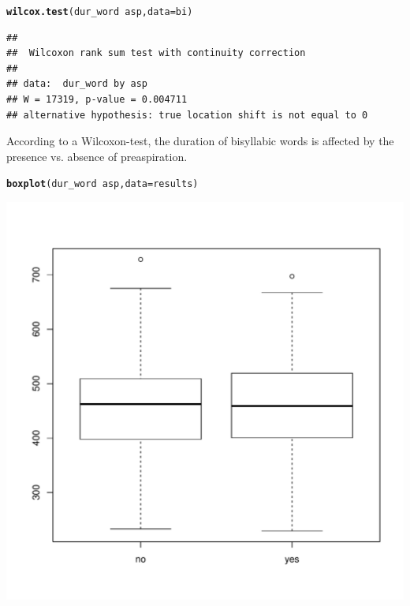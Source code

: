 \documentclass[a4paper,11pt]{article}\usepackage[]{graphicx}\usepackage[]{color}
\makeatletter
\def\maxwidth{ %
  \ifdim\Gin@nat@width>\linewidth
    \linewidth
  \else
    \Gin@nat@width
  \fi
}
\newcommand{\hlopt}[1]{\textcolor[rgb]{0,0,0}{#1}}%
\newcommand{\hlstd}[1]{\textcolor[rgb]{0.345,0.345,0.345}{#1}}%
\newcommand{\hlkwc}[1]{\textcolor[rgb]{0.333,0.667,0.333}{#1}}%
\newcommand{\hlkwd}[1]{\textcolor[rgb]{0.737,0.353,0.396}{\textbf{#1}}}%
\newenvironment{kframe}{%
 \def\at@end@of@kframe{}%
 \ifinner\ifhmode%
  \def\at@end@of@kframe{\end{minipage}}%
  \begin{minipage}{\columnwidth}%
 \fi\fi%
 \def\FrameCommand##1{\hskip\@totalleftmargin \hskip-\fboxsep
 \colorbox{shadecolor}{##1}\hskip-\fboxsep
     \hskip-\linewidth \hskip-\@totalleftmargin \hskip\columnwidth}%
 \MakeFramed {\advance\hsize-\width
   \@totalleftmargin\z@ \linewidth\hsize
   \@setminipage}}%
 {\par\unskip\endMakeFramed%
 \at@end@of@kframe}
\newenvironment{knitrout}{}{} %
\makeatother
\begin{document}
\begin{knitrout}
\color{fgcolor}\begin{kframe}
\begin{alltt}
\hlkwd{wilcox.test}\hlstd{(dur_word} \hlopt{~} \hlstd{asp,} \hlkwc{data} \hlstd{= bi)}
\end{alltt}
\begin{verbatim}
## 
## 	Wilcoxon rank sum test with continuity correction
## 
## data:  dur_word by asp
## W = 17319, p-value = 0.004711
## alternative hypothesis: true location shift is not equal to 0
\end{verbatim}
\end{kframe}
\end{knitrout}

According to a Wilcoxon-test, the duration of bisyllabic words is affected by the presence vs. absence of preaspiration.


\begin{knitrout}
\color{fgcolor}\begin{kframe}
\begin{alltt}
\hlkwd{boxplot}\hlstd{(dur_word} \hlopt{~} \hlstd{asp,} \hlkwc{data} \hlstd{= results)}
\end{alltt}
\end{kframe}
\includegraphics[width=\maxwidth]{img/results-box-1} 

\end{knitrout}
\end{document}
